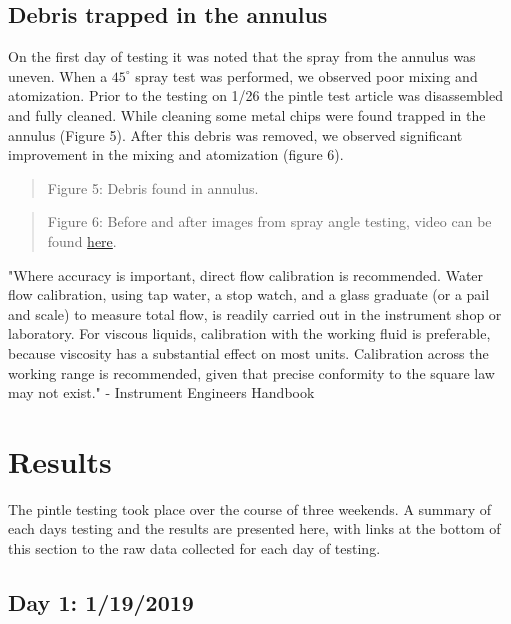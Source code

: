 \documentclass[11pt]{article}
\begin{document}
\subsection{Debris trapped in the
annulus}\label{debris-trapped-in-the-annulus}

On the first day of testing it was noted that the spray from the annulus
was uneven. When a \(45^{\circ}\) spray test was performed, we observed
poor mixing and atomization. Prior to the testing on 1/26 the pintle
test article was disassembled and fully cleaned. While cleaning some
metal chips were found trapped in the annulus (Figure 5). After this
debris was removed, we observed significant improvement in the mixing
and atomization (figure 6).

\begin{quote}
Figure 5: Debris found in annulus.
\end{quote}

\begin{quote}
Figure 6: Before and after images from spray angle testing, video can be
found
\href{https://github.com/psas/liquid-engine-test-stand/blob/master/Pintle/Pintle_V1\%20testing/Images/side\%20by\%20side\%20spray\%20angle.wmv}{here}.
\end{quote}

"Where accuracy is important, direct flow calibration is recommended.
Water flow calibration, using tap water, a stop watch, and a glass
graduate (or a pail and scale) to measure total flow, is readily carried
out in the instrument shop or laboratory. For viscous liquids,
calibration with the working fluid is preferable, because viscosity has
a substantial effect on most units. Calibration across the working range
is recommended, given that precise conformity to the square law may not
exist." - Instrument Engineers Handbook

    \section{Results}\label{results}

The pintle testing took place over the course of three weekends. A
summary of each days testing and the results are presented here, with
links at the bottom of this section to the raw data collected for each
day of testing.

\subsection{Day 1: 1/19/2019}\label{day-1-1192019}
\end{document}
